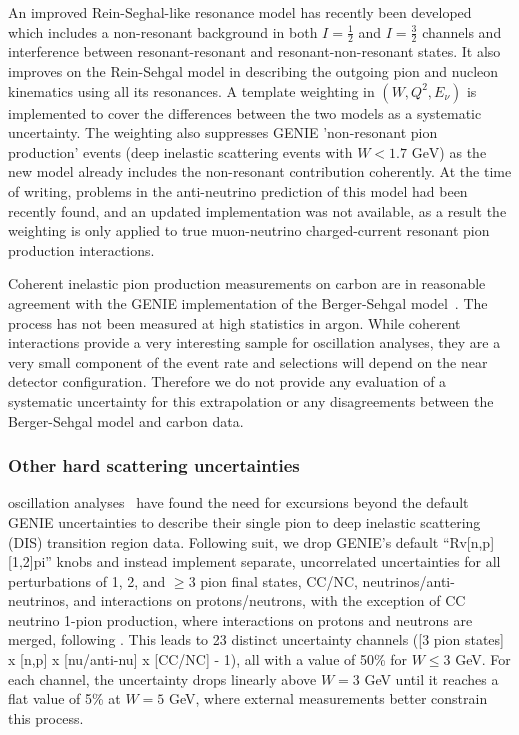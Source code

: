 An improved Rein-Seghal-like resonance model has recently been developed~\cite{minoo} which includes a non-resonant background in both $I=\frac{1}{2}$ and $I=\frac{3}{2}$ channels and interference between resonant-resonant and resonant-non-resonant states. %
It also improves on the Rein-Sehgal model in describing the outgoing pion and nucleon kinematics using all its resonances.
A template weighting in $(W, Q^2, E_\nu)$ is implemented to cover the differences between the two models as a systematic uncertainty. The weighting also suppresses GENIE 'non-resonant pion production' events (deep inelastic scattering events with $W<1.7\text{ GeV}$) as the new model already includes the non-resonant contribution coherently. At the time of writing, problems in the anti-neutrino prediction of this model had been recently found, and an updated implementation was not available, as a result the weighting is only applied to true muon-neutrino charged-current resonant pion production interactions.

Coherent inelastic pion production measurements on carbon are in reasonable agreement with the GENIE implementation of the Berger-Sehgal model~\cite{Mislivec:2017qfz}.  The process has not been measured at high statistics in argon. While coherent interactions provide a very interesting sample for oscillation analyses, they are a very small component of the event rate and selections will depend on the near detector configuration. Therefore we do not provide any evaluation of a systematic uncertainty for this extrapolation or any disagreements between the Berger-Sehgal model and carbon data.

\subsubsection{Other hard scattering uncertainties}
\nova oscillation analyses~\cite{nova_2018} have found the need for excursions beyond the default GENIE uncertainties to describe their single pion to deep inelastic scattering (DIS) transition region data.  Following suit, we drop GENIE's default ``Rv[n,p][1,2]pi'' knobs and instead implement separate, uncorrelated uncertainties for all perturbations of 1, 2, and $\geq 3$ pion final states, CC/NC, neutrinos/anti-neutrinos, and interactions on protons/neutrons, with the exception of CC neutrino 1-pion production, where interactions on protons and neutrons are merged, following \cite{Rodrigues:2016xjj}. This leads to 23 distinct uncertainty channels ([3 pion states] x [n,p] x [nu/anti-nu] x [CC/NC] - 1), all with a value of 50\% for $W \leq 3$ GeV.  For each channel, the uncertainty drops linearly above $W = 3$ GeV until it reaches a flat value of 5\% at $W = 5$ GeV, where external measurements better constrain this process.

